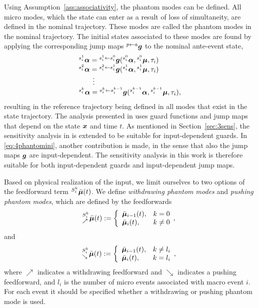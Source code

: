 \documentclass[../DC2017114Bouma.tex]{subfiles}
\begin{document}
Using Assumption~\ref{ass:associativity}, the phantom modes can be defined. All micro modes, which the state can enter as a result of loss of simultaneity, are defined in the nominal trajectory. These modes are called the phantom modes in the nominal trajectory. The initial states associated to these modes are found by applying the corresponding jump maps $\hspace{0cm}^{p\leftarrow a}{\boldsymbol{g}}$ to the nominal ante-event state,
\begin{equation}
\begin{array}{l}
\hspace{0cm}^{s_i^1}\boldsymbol{\alpha} =\hspace{0cm}^{s_i^1\leftarrow s_i^0}{\boldsymbol{g}}(\hspace{0cm}^{s_i^0}\boldsymbol{\alpha},\hspace{0cm}^{s_i^0}\boldsymbol{\mu},\tau_i)\\
\hspace{0cm}^{s_i^2}\boldsymbol{\alpha} =\hspace{0cm}^{s_i^2\leftarrow s_i^1}{\boldsymbol{g}}(\hspace{0cm}^{s_i^1}\boldsymbol{\alpha},\hspace{0cm}^{s_i^1}\boldsymbol{\mu},\tau_i)\\
\qquad\vdots\\
\hspace{0cm}^{s_i^{k}}\boldsymbol{\alpha} =\hspace{0cm}^{s_i^k\leftarrow s_i^{k-1}}{\boldsymbol{g}}(\hspace{0cm}^{s_i^{k-1}}\boldsymbol{\alpha},\hspace{0cm}^{s_i^{k-1}}\boldsymbol{\mu},\tau_i),
\end{array}\label{eq:4phantomini}
\end{equation}
resulting in the reference trajectory being defined in all modes that exist in the state trajectory. The analysis presented in \cite{Rijnen2017} uses guard functions and jump maps that depend on the state ${\boldsymbol{x}}$ and time $t$. As mentioned in Section~\ref{sec:3sens}, the sensitivity analysis in \cite{Rijnen2017} is extended to be suitable for input-dependent guards. In \eqref{eq:4phantomini}, another contribution is made, in the sense that also the jump maps ${\boldsymbol{g}}$ are input-dependent. The sensitivity analysis in this work is therefore suitable for both input-dependent guards and input-dependent jump maps. 

Based on physical realization of the input, we limit ourselves to two options of the feedforward term $\hspace{0cm}^{S^k_i}\bar{\boldsymbol{\mu}}(t)$. We define \textit{withdrawing phantom modes} and \textit{pushing phantom modes}, which are defined by the feedforwards
\begin{equation}
\hspace{0cm}^{S^k_i}_{\nearrow}\bar{\boldsymbol{\mu}}(t) := \left\lbrace\begin{array}{ll}
\bar{\boldsymbol{\mu}}_{i-1}(t), & k = 0\\
\bar{\boldsymbol{\mu}}_i(t), & k \neq 0
\end{array},\right.
\end{equation}
and
\begin{equation}
\hspace{0cm}^{S^k_i}_{\searrow}\bar{\boldsymbol{\mu}}(t) := \left\lbrace\begin{array}{ll}
\bar{\boldsymbol{\mu}}_{i-1}(t), & k \neq l_i\\
\bar{\boldsymbol{\mu}}_i(t), & k = l_i
\end{array},\right.\label{eq:4phantominp}
\end{equation}
where $\nearrow$ indicates a withdrawing feedforward and $\searrow$ indicates a pushing feedforward, and $l_i$ is the number of micro events associated with macro event $i$. For each event it should be specified whether a withdrawing or pushing phantom mode is used.
\end{document}
